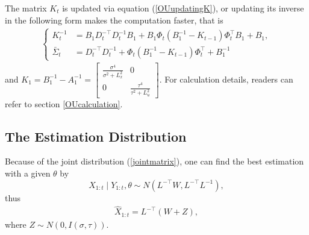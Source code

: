 The matrix $K_{t}$ is updated via equation (\ref{OUupdatingK}), or updating its inverse in the following form makes the computation faster, that is 
\begin{align*}
\begin{cases}
K_{t}^{-1} &= B_1D_{t}^{-\top}D_{t}^{-1}B_1 + B_1\Phi_{t} (B_1^{-1} - K_{t-1}) \Phi_{t}^\top B_1+ B_1,\\
\bar{\Sigma}_{t}&= D_{t}^{-\top}D_{t}^{-1}+ \Phi_{t} (B_1^{-1} - K_{t-1}) \Phi_{t}^\top + B_1^{-1}
\end{cases}
\end{align*}
and $K_1 =B_1^{-1} - A_1^{-1} = \begin{bmatrix}
\frac{\sigma^4}{\sigma^2 +L_x^2} & 0 \\ 0 &\frac{\tau^4}{\tau^2 +L_u^2}
\end{bmatrix} $. For calculation details, readers can refer to section \ref{OUcalculation}. 

\subsection{The Estimation Distribution}

Because of the joint distribution (\ref{jointmatrix}), one can find the best estimation with a given $\theta$ by
\begin{equation*}
X_{1:t} \mid Y_{1:t},\theta \sim N(L^{-\top}W,L^{-\top}L^{-1}),
\end{equation*}
thus
\begin{align*}
\hat{X} _{1:t}= L^{-\top}(W+Z),
\end{align*}
where $Z \sim N(0, I(\sigma,\tau))$.


